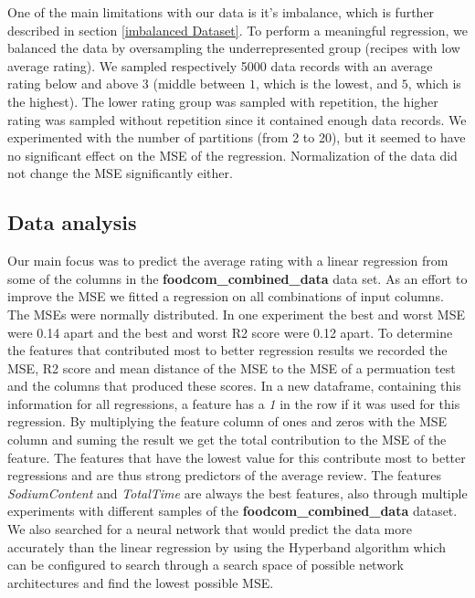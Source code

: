 \documentclass{article}
\begin{document}
One of the main limitations with our data is it's imbalance, which is further described in section \ref{imbalanced Dataset}. To perform a meaningful regression, we balanced the data by oversampling the underrepresented group (recipes with low average rating). We sampled respectively 5000 data records with an average rating below and above $3$ (middle between $1$, which is the lowest, and $5$, which is the highest). The lower rating group was sampled with repetition, the higher rating was sampled without repetition since it contained enough data records. We experimented with the number of partitions (from 2 to 20), but it seemed to have no significant effect on the MSE of the regression. Normalization of the data did not change the MSE significantly either.\\

\subsection{Data analysis} 
Our main focus was to predict the average rating with a linear regression from some of the columns in the \textbf{foodcom\_combined\_data} data set. 
As an effort to improve the MSE we fitted a regression on all combinations of input columns. The MSEs were normally distributed. In one experiment the best and worst MSE were 0.14 apart and the best and worst R2 score were 0.12 apart. To determine the features that contributed most to better regression results we recorded the MSE, R2 score and mean distance of the MSE to the MSE of a permuation test and the columns that produced these scores. In a new dataframe, containing this information for all regressions, a feature has a \textit{1} in the row if it was used for this regression. By multiplying the feature column of ones and zeros with the MSE column and suming the result we get the total contribution to the MSE of the feature. The features that have the lowest value for this contribute most to better regressions and are thus strong predictors of the average review. The features \textit{SodiumContent} and \textit{TotalTime} are always the best features, also through multiple experiments with different samples of the \textbf{foodcom\_combined\_data} dataset.\\
We also searched for a neural network that would predict the data more accurately than the linear regression by using the Hyperband algorithm\cite{hyperband:2016} which can be configured to search through a search space of possible network architectures and find the lowest possible MSE. 
\end{document}
